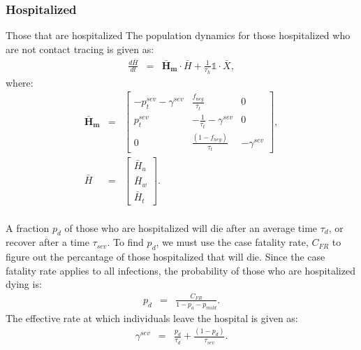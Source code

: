 \documentclass[notitlepage, superscriptaddress]{revtex4-2}
\begin{document}
\subsubsection{Hospitalized}
Those that are hospitalized 
The population dynamics for those hospitalized who are not contact tracing is given as:
\begin{eqnarray}
\frac{d\bar{H}}{dt} &=& \boldsymbol{\bar{H}_{m}} \cdot  \bar{H} + \frac{1}{\tau_{h}} \mathbb{1} \cdot  \bar{X}, 
\end{eqnarray}
%
where:
\begin{eqnarray}
\boldsymbol{\bar{H}_{m}} &=&
\begin{bmatrix}
- p^{sev}_{t} - \gamma^{sev}  &  \frac{f_{neg}}{\tau_{t}}            & 0 \\ 
 p^{sev}_{t}              & -\frac{1}{\tau_{t}} - \gamma^{sev}       & 0  \\ 
 0                  & \frac{(1- f_{neg})}{\tau_{t}}                        & -\gamma^{sev}
\end{bmatrix}, \\ 
%
\bar{H} &=& 
\begin{bmatrix}
\bar{H}_{u} \\ \bar{H}_{w}\\ \bar{H}_{t}
\end{bmatrix}. \\ 
%
\end{eqnarray}

A fraction $p_{d}$ of those who are hospitalized will die after an average time $\tau_{d}$, or recover after a time $\tau_{sev}$. To find $p_{d}$, we must use the case fatality rate, $C_{FR}$ to figure out the percantage of those hospitalized that will die. Since the case fatality rate applies to all infections, the probability of those who are hospitalized dying is:
\begin{eqnarray}
p_{d} &=& \frac{C_{FR}}{1- p_{a} - p_{mild}}.
\end{eqnarray}
The effective rate at which individuals leave the hospital is given as:
\begin{eqnarray}
\gamma^{sev} &=& \frac{p_{d}}{\tau_{d}} + \frac{(1-p_{d})}{\tau_{sev}}.
\end{eqnarray}
\end{document}
